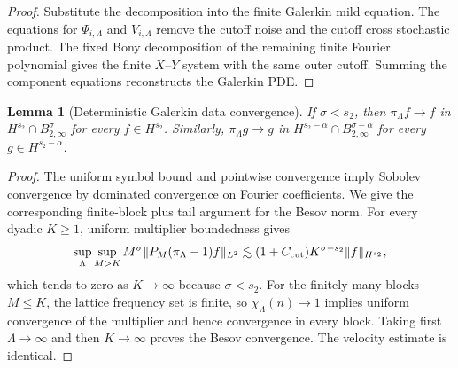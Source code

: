 \documentclass[10pt]{amsart}
\numberwithin{equation}{section}
\theoremstyle{plain}
\newtheorem{lemma}[theorem]{Lemma}
\theoremstyle{definition}
\theoremstyle{remark}
\begin{document}
\begin{proof}
Substitute the decomposition into the finite Galerkin mild equation.  The equations for $\Psi_{i,\Lambda}$ and $V_{i,\Lambda}$ remove the cutoff noise and the cutoff cross stochastic product.  The fixed Bony decomposition of the remaining finite Fourier polynomial gives the finite $X$--$Y$ system with the same outer cutoff.  Summing the component equations reconstructs the Galerkin PDE.
\end{proof}

\begin{lemma}[Deterministic Galerkin data convergence]\label{lem:deterministic-galerkin-data-convergence}
If $\sigma<s_2$, then $\pi_\Lambda f\to f$ in $H^{s_2}\cap B_{2,\infty}^{\sigma}$ for every $f\in H^{s_2}$.  Similarly, $\pi_\Lambda g\to g$ in $H^{s_2-\alpha}\cap B_{2,\infty}^{\sigma-\alpha}$ for every $g\in H^{s_2-\alpha}$.
\end{lemma}

\begin{proof}
The uniform symbol bound and pointwise convergence imply Sobolev convergence by dominated convergence on Fourier coefficients.  We give the corresponding finite-block plus tail argument for the Besov norm.  For every dyadic $K\ge1$, uniform multiplier boundedness gives
\[
 \sup_\Lambda\sup_{M>K}
 M^\sigma\|P_M(\pi_\Lambda-1)f\|_{L^2}
 \lesssim (1+C_{\rm cut})
 K^{\sigma-s_2}\|f\|_{H^{s_2}},
\]
which tends to zero as $K\to\infty$ because $\sigma<s_2$.  For the finitely many blocks $M\le K$, the lattice frequency set is finite, so \(\chi_\Lambda(n)\to1\) implies uniform convergence of the multiplier and hence convergence in every block.  Taking first \(\Lambda\to\infty\) and then \(K\to\infty\) proves the Besov convergence.  The velocity estimate is identical.
\end{proof}
\end{document}

